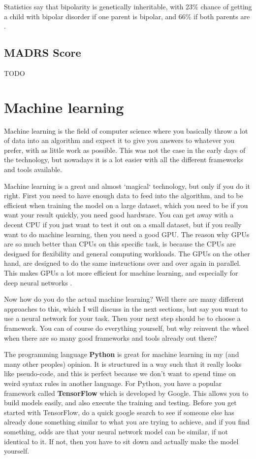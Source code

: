 Statistics say that bipolarity is genetically inheritable, with 23\% chance of getting a child with bipolar disorder 
if one parent is bipolar, and 66\% if both parents are \cite{bipolar_statistics}. 

\subsection{MADRS Score}
TODO


\newpage
\section{Machine learning}
Machine learning is the field of computer science where you basically throw a lot of data into an algorithm
and expect it to give you answers to whatever you prefer, with as little work as possible. 
This was not the case in the early days of the technology, but nowadays it is a lot easier with all the different 
frameworks and tools available.

Machine learning is a great and almost `magical` technology, but only if you do it right.
First you need to have enough data to feed into the algorithm, and to be efficient when training the model on a 
large dataset, which you need to be if you want your result quickly, you need good hardware. You can get away with a 
decent CPU if you just want to test it out on a small dataset, but if you really want to do machine learning,
then you need a good GPU. The reason why GPUs are so much better than CPUs on this specific task, 
is because the CPUs are designed for flexibility and general computing workloads. The GPUs on the other hand, 
are designed to do the same instructions over and over again in parallel. This makes GPUs a lot more efficient for 
machine learning, and especially for deep neural networks \cite{cpu_vs_gpu_ml}. 

Now how do you do the actual machine learning? Well there are many different approaches to this, which I will discuss 
in the next sections, but say you want to use a neural network for your task. Then your next step should be to 
choose a framework. You can of course do everything yourself, but why reinvent the wheel when there are so many good 
frameworks and tools already out there? 

The programming language \textbf{Python} is great for machine learning in my (and many other peoples) opinion. 
It is structured in a way such that it really looks like pseudo-code, and this is perfect because we don't want to 
spend time on weird syntax rules in another language. For Python, you have a popular framework called \textbf{TensorFlow} 
which is developed by Google. This allows you to build models easily, and also execute the training and testing. 
Before you get started with TensorFlow, do a quick google search to see if someone else has already done something 
similar to what you are trying to achieve, and if you find something, odds are that your neural network model can be 
similar, if not identical to it. If not, then you have to sit down and actually make the model yourself. 

